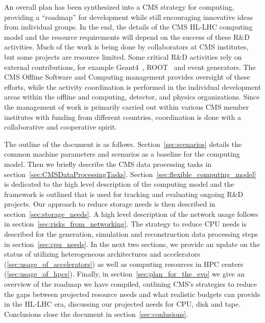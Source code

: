 \documentclass{cmspaper}
\begin{document}
An overall plan has been synthesized into a CMS strategy for computing, providing a ``roadmap'' for development while still encouraging innovative ideas from individual groups. In the end, the details of the CMS HL-LHC computing model and the resource requirements will depend on the success of these R\&D activities. Much of the work is being done by collaborators at CMS institutes, but some projects are resource limited. Some critical R\&D activities rely on external contributions, for example Geant4~\cite{Agostinelli}, ROOT~\cite{BRUN199781} and event generators. The CMS Offline Software and Computing management provides oversight of these efforts, while the activity coordination is performed in the individual development areas within the offline and computing, detector, and physics organizations. Since the management of work is primarily carried out within various CMS member institutes with funding from different countries, coordination is done with a collaborative and cooperative spirit. 
 
The outline of the document is as follows. Section~\ref{sec:scenarios} details the common machine parameters and scenarios as a baseline for the computing model. 
Then we briefly describe the CMS data processing tasks in section~\ref{sec:CMSDataProcessingTasks}. 
Section~\ref{sec:flexible_computing_model} is dedicated to the high level description of the computing model and the framework is outlined that is used for tracking and evaluating ongoing R\&D projects.
Our approach to reduce storage needs is then described in section~\ref{sec:storage_needs}.
A high level description of the network usage follows in section~\ref{sec:risks_from_networking}.
The strategy to reduce CPU needs is described for the generation, simulation and reconstruction data processing steps in section~\ref{sec:cpu_needs}.
In the next two sections, we provide an update on the status of utilizing heterogeneous architectures and accelerators (\ref{sec:usage_of_accelerators}) as well as computing resources in HPC centers (\ref{sec:usage_of_hpcs}).
Finally, in section~\ref{sec:plan_for_the_evo} we give an overview of the roadmap we have compiled, outlining CMS’s strategies to reduce the gaps between projected resource needs and what realistic budgets can provide in the HL-LHC era, discussing our projected needs for CPU, disk and tape.
Conclusions close the document in section~\ref{sec:conlusions}.

\end{document}
